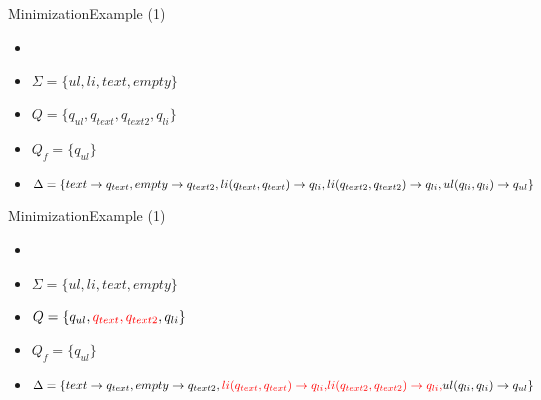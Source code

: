 \documentclass{beamer}
\begin{document}
\begin{frame}{Minimization}{Example (1)}
	\begin{example}
		\begin{itemize}
			\item { 
				\automatonDefinition
			}
			\item {
				\(\Sigma = \{ul, li, text, empty\}\)
			}
			\item {
				\(Q = \{q_{ul}, q_{text}, q_{text2}, q_{li}\}\)
			}
			\item {
				\(Q_f = \{ q_{ul} \}\)
			}
			\item {
				\(\Delta = \{		text \rightarrow q_{text},
							\newline
							empty \rightarrow q_{text2},
							\newline
							li(q_{text}, q_{text}) \rightarrow q_{li},		
							\newline
							li(q_{text2}, q_{text2}) \rightarrow q_{li},
							\newline
							ul(q_{li}, q_{li}) \rightarrow q_{ul}
				\}\)
			}
		\end{itemize}
	\end{example}
\end{frame}

\begin{frame}{Minimization}{Example (1)}
	\begin{example}
		\begin{itemize}
			\item { 
				\automatonDefinition
			}
			\item {
				\(\Sigma = \{ul, li, text, empty\}\)
			}
			\item {
				\(Q = \{q_{ul}, \textcolor{red}{q_{text}, q_{text2}}, q_{li}\}\)
			}
			\item {
				\(Q_f = \{ q_{ul} \}\)
			}
			\item {
				\(\Delta = \{		text \rightarrow q_{text},
							\newline
							empty \rightarrow q_{text2},
							\newline
							\textcolor{red} {
								li(q_{text}, q_{text}) \rightarrow q_{li},	
							}	
							\newline
							\textcolor{red} {
								li(q_{text2}, q_{text2}) \rightarrow q_{li},
							}
							\newline
							ul(q_{li}, q_{li}) \rightarrow q_{ul}
				\}\)
			}
		\end{itemize}
	\end{example}
\end{frame}
\end{document}
